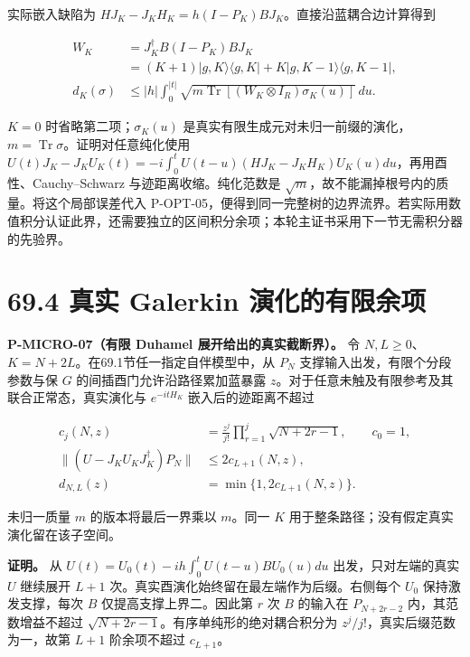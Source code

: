 \documentclass[
  11pt,
  oneside]{book}
\begin{document}
实际嵌入缺陷为 \(HJ_K-J_KH_K=h(I-P_K)BJ_K\)。直接沿蓝耦合边计算得到

\[
\begin{aligned}
W_K&=J_K^\dagger B(I-P_K)BJ_K\\
&=(K+1)|g,K\rangle\langle g,K|
 +K|g,K-1\rangle\langle g,K-1|,\\
d_K(\sigma)&\le |h|\int_0^{|t|}
\sqrt{m\operatorname{Tr}[(W_K\otimes I_R)\sigma_K(u)]}\,du.
\end{aligned}
\]

\(K=0\) 时省略第二项；\(\sigma_K(u)\)
是真实有限生成元对未归一前缀的演化，\(m=\operatorname{Tr}\sigma\)。证明对任意纯化使用
\(U(t)J_K-J_KU_K(t)=-i\int_0^tU(t-u)(HJ_K-J_KH_K)U_K(u)du\)，再用酉性、Cauchy--Schwarz
与迹距离收缩。纯化范数是
\(\sqrt m\)，故不能漏掉根号内的质量。将这个局部误差代入
P-OPT-05，便得到同一完整树的边界流界。若实际用数值积分认证此界，还需要独立的区间积分余项；本轮主证书采用下一节无需积分器的先验界。

\section{69.4 真实 Galerkin 演化的有限余项}

\protect\hypertarget{p-micro-07}{}{}

\textbf{P-MICRO-07（有限 Duhamel 展开给出的真实截断界）。} 令
\(N,L\ge0\)、\(K=N+2L\)。在69.1节任一指定自伴模型中，从 \(P_N\)
支撑输入出发，有限个分段参数与保 \(G\) 的间插酉门允许沿路径累加蓝暴露
\(z\)。对于任意未触及有限参考及其联合正常态，真实演化与 \(e^{-itH_K}\)
嵌入后的迹距离不超过

\[
\begin{aligned}
c_j(N,z)&=\frac{z^j}{j!}\prod_{r=1}^{j}\sqrt{N+2r-1},\qquad c_0=1,\\
\|(U-J_KU_KJ_K^\dagger)P_N\|&\le2c_{L+1}(N,z),\\
d_{N,L}(z)&=\min\{1,2c_{L+1}(N,z)\}.
\end{aligned}
\]

未归一质量 \(m\) 的版本将最后一界乘以 \(m\)。同一 \(K\)
用于整条路径；没有假定真实演化留在该子空间。

\textbf{证明。} 从 \(U(t)=U_0(t)-ih\int_0^tU(t-u)BU_0(u)du\)
出发，只对左端的真实 \(U\) 继续展开 \(L+1\)
次。真实酉演化始终留在最左端作为后缀。右侧每个 \(U_0\)
保持激发支撑，每次 \(B\) 仅提高支撑上界二。因此第 \(r\) 次 \(B\)
的输入在 \(P_{N+2r-2}\) 内，其范数增益不超过
\(\sqrt{N+2r-1}\)。有序单纯形的绝对耦合积分为
\(z^j/j!\)，真实后缀范数为一，故第 \(L+1\) 阶余项不超过 \(c_{L+1}\)。
\end{document}
